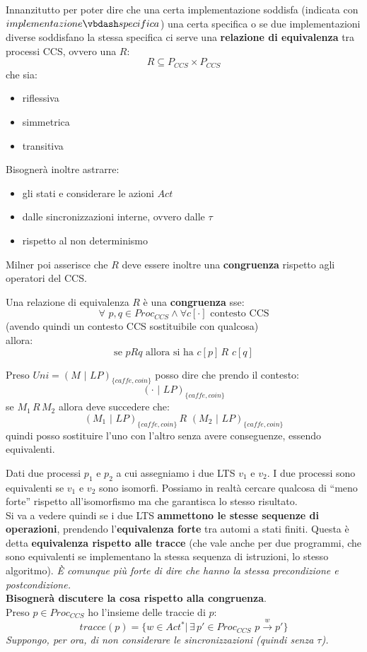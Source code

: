 \documentclass[a4paper,12pt, oneside]{book}
\begin{document}
Innanzitutto per poter dire che una certa implementazione soddisfa (indicata con
$implementazione \vbdash specifica$) una certa
specifica o se due implementazioni diverse soddisfano la stessa specifica ci
serve una \textbf{relazione di equivalenza} tra processi CCS, ovvero una $R$:
\[R\subseteq P_{CCS}\times P_{CCS}\]
che sia:
\begin{itemize}
  \item riflessiva
  \item simmetrica
  \item transitiva
\end{itemize}
Bisognerà inoltre astrarre:
\begin{itemize}
  \item gli stati e considerare le azioni $Act$
  \item dalle sincronizzazioni interne, ovvero dalle $\tau$
  \item rispetto al non determinismo
\end{itemize}
Milner poi asserisce che $R$ deve essere inoltre una \textbf{congruenza}
rispetto agli operatori del CCS.\\
\begin{definizione}
  Una relazione di equivalenza $R$ è una \textbf{congruenza} sse:
  \[\forall \,\,p,q\in Proc_{CCS} \land \forall c[\cdot] \mbox{ contesto CCS}\]
  (avendo quindi un contesto CCS sostituibile con qualcosa)\\
  allora:
  \[\mbox{se }pRq\mbox{ allora si ha }c[p]\,R\,\,c[q]\]
\end{definizione}
\begin{esempio}
  Preso $Uni=(M\,\,|\,\,LP)_{\{caffe,coin\}}$ posso dire che prendo il contesto:
  \[(\cdot\,\,|\,\,LP)_{\{caffe,coin\}}\]
  se $M_1\,R\,M_2$ allora deve succedere che:
  \[(M_1\,\,|\,\,LP)_{\{caffe,coin\}}\,R\,\,(M_2\,\,|\,\,LP)_{\{caffe,coin\}}\]
  quindi posso sostituire l'uno con l'altro senza avere conseguenze, essendo
  equivalenti.
\end{esempio}
\begin{teorema}
  Dati due processi $p_1$ e $p_2$ a cui assegniamo i due LTS $v_1$ e $v_2$. I
  due processi sono equivalenti se $v_1$ e $v_2$ sono isomorfi. Possiamo in
  realtà cercare qualcosa di ``meno forte'' rispetto all'isomorfismo ma che
  garantisca lo stesso risultato.\\
  Si va a vedere quindi se i due LTS \textbf{ammettono le stesse sequenze di
    operazioni}, prendendo l'\textbf{equivalenza forte} tra automi a stati
  finiti. Questa è detta \textbf{equivalenza rispetto alle tracce} (che vale
  anche per due programmi, che sono equivalenti se implementano la stessa
  sequenza di istruzioni, lo stesso algoritmo). \textit{È comunque più forte di
    dire che hanno la stessa precondizione e postcondizione.}\\
  \textbf{Bisognerà discutere la cosa rispetto alla congruenza}.\\
   Preso $p\in Proc_{CCS}$ ho l'insieme delle traccie di $p$:
  \[tracce(p)=\{w\in Act^*|\,\exists\,p'\in Proc_{CCS}
    \,\,p\stackrel{w}{\rightarrow} p'\}\]
  \textit{Suppongo, per ora, di non considerare le sincronizzazioni (quindi
    senza $\tau$).} 
\end{teorema}
\end{document}
